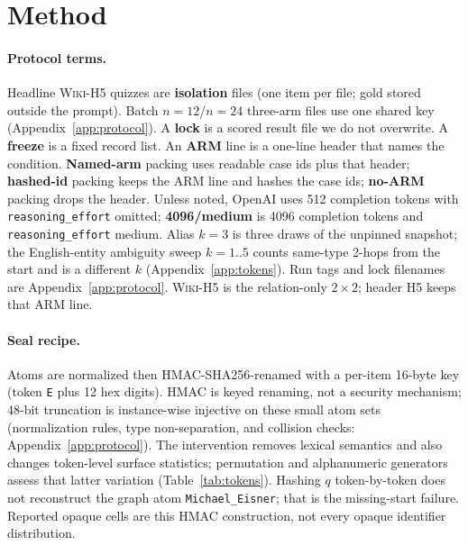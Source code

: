 \documentclass[10pt]{article} %
\begin{document}
\section{Method}
\label{sec:method}

\paragraph{Protocol terms.}
Headline \textsc{Wiki-H5} quizzes are \textbf{isolation} files (one item
per file; gold stored outside the prompt). Batch $n{=}12$/$n{=}24$
three-arm files use one shared key (Appendix~\ref{app:protocol}).
A \textbf{lock} is a scored result file we do not overwrite. A
\textbf{freeze} is a fixed record list.
An \textbf{ARM} line is a one-line header that names the condition.
\textbf{Named-arm} packing uses readable case ids plus that header;
\textbf{hashed-id} packing keeps the ARM line and hashes the case ids;
\textbf{no-ARM} packing drops the header.
Unless noted, OpenAI uses 512 completion tokens with
\texttt{reasoning\_effort} omitted;
\textbf{4096/medium} is 4096 completion tokens and
\texttt{reasoning\_effort} medium.
Alias $k{=}3$ is three draws of the unpinned snapshot; the English-entity
ambiguity sweep $k{=}1..5$ counts same-type 2-hops from the start and is a
different $k$ (Appendix~\ref{app:tokens}).
Run tags and lock filenames are Appendix~\ref{app:protocol}.
\textsc{Wiki-H5} is the relation-only $2{\times}2$; header H5 keeps that
ARM line.

\paragraph{Seal recipe.}
Atoms are normalized then HMAC-SHA256-renamed with a per-item 16-byte key
(token \texttt{E} plus 12 hex digits). HMAC is keyed renaming, not a
security mechanism; 48-bit truncation is instance-wise injective on these
small atom sets (normalization rules, type non-separation, and collision
checks: Appendix~\ref{app:protocol}). The intervention removes lexical
semantics and also changes token-level surface statistics; permutation and
alphanumeric generators assess that latter variation
(Table~\ref{tab:tokens}). Hashing $q$ token-by-token does not reconstruct
the graph atom \texttt{Michael\_Eisner}; that is the missing-start failure.
Reported opaque cells are this HMAC construction, not every opaque
identifier distribution.
\end{document}
